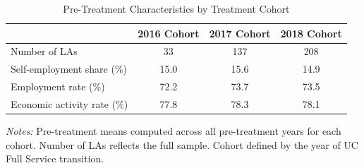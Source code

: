 
\begin{table}[htbp]
\centering
\caption{Pre-Treatment Characteristics by Treatment Cohort}
\label{tab:cohort}
\begin{tabular}{lccc}
\toprule
& 2016 Cohort & 2017 Cohort & 2018 Cohort \\
\midrule
Number of LAs & 33 & 137 & 208 \\
Self-employment share (\%) & 15.0 & 15.6 & 14.9 \\
Employment rate (\%) & 72.2 & 73.7 & 73.5 \\
Economic activity rate (\%) & 77.8 & 78.3 & 78.1 \\
\bottomrule
\end{tabular}
\begin{tablenotes}
\small
\item \textit{Notes:} Pre-treatment means computed across all pre-treatment years for each cohort. Number of LAs reflects the full sample. Cohort defined by the year of UC Full Service transition.
\end{tablenotes}
\end{table}

